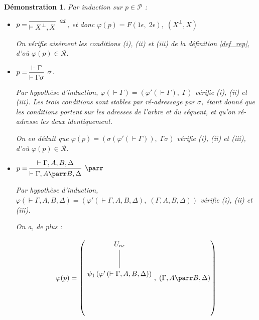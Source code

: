 \documentclass[11pt,a4paper]{article}
\newtheorem{demonstration}{Démonstration}
\newcommand*{\orth}{^\perp}
\newcommand*{\hypv}[1]{\hypo{\vdash #1}}
\newcommand*{\axv}[1]{\infer{0}[\ensuremath{\mathit{ax}}]{\vdash #1}}
\newcommand*{\parrv}[1]{\infer{1}[\ensuremath{\parr}]{\vdash #1}}
\newcommand*{\permv}[1]{\infer{1}[\ensuremath{\sigma}]{\vdash #1}}
\newcommand*{\proofs}{\ensuremath{\mathcal{P}}}
\newcommand*{\representations}{\ensuremath{\mathcal{R}}}
\newcommand*{\encode}{\ensuremath{\varphi}}
\begin{document}
\begin{demonstration}
    Par induction sur $p \in \proofs$ :

    \begin{itemize}
    \item[(i) Axiome :]$p =
    \begin{prooftree}
        \axv{X\orth, X}
    \end{prooftree}$,
    et donc $\encode \left( p \right) = F(1 \epsilon, \; 2 \epsilon), \; \left( X\orth, X \right)$

    On vérifie aisément les conditions (i), (ii) et (iii) de la définition \ref{def_rep}, d'où $\encode \left( p \right) \in \representations$.

    \item[(ii) Permutation :]$p = 
    \begin{prooftree}
        \hypv{\Gamma}
        \permv{\Gamma{\sigma}}
    \end{prooftree}$.
    
    Par hypothèse d'induction, $\encode \left( \vdash \Gamma \right) = \left( \encode ' \left( \vdash \Gamma \right), \; \Gamma \right)$ vérifie (i), (ii) et (iii). Les trois conditions sont stables par ré-adressage par $\sigma$, étant donné que les conditions portent sur les adresses de l'arbre et du séquent, et qu'on ré-adresse les deux identiquement.

    On en déduit que $\encode \left( p \right) = \left( \sigma \left( \encode ' \left( \vdash \Gamma \right) \right), \; \Gamma{\sigma} \right)$ vérifie (i), (ii) et (iii), d'où $\encode \left( p \right) \in \representations$.

    \item[(iii) Parr :]$p =
    \begin{prooftree}
      \hypv{\Gamma, A, B, \Delta}
      \parrv{\Gamma, A \parr B, \Delta}
    \end{prooftree}$

    Par hypothèse d'induction, $\encode \left( \vdash \Gamma, A, B, \Delta \right) = \left( \encode ' \left( \vdash \Gamma, A, B, \Delta \right), \; \left( \Gamma, A, B, \Delta \right) \right)$ vérifie (i), (ii) et (iii).
    
    On a, de plus :

    \begin{equation*}
    \encode ( p ) = \left( \begin{tikzpicture}%
    [level distance=1.5cm,
    level 2/.style={sibling distance=3.5cm}]
    \node {$U_{n \epsilon}$}
        child {node {$\psi_1 \left( \encode' \left( \vdash \Gamma, A, B, \Delta \right) \right)$}
    };
    \end{tikzpicture}, \; \left( \Gamma, A \parr B, \Delta \right) \right)
    \end{equation*}


\end{itemize}
\end{demonstration}
\end{document}
